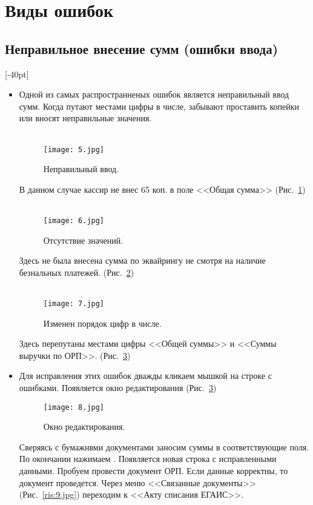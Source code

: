 \section{Виды ошибок}
\subsection{Неправильное внесение сумм (ошибки ввода)}
[-40pt]

\begin{itemize}	
	\item Одной из самых распространненых ошибок является неправильный ввод сумм. Когда путают местами цифры в числе, забывают проставить копейки или вносят неправильные значения.
	\\
	\\
	\begin{figure}[H]
		\texttt{[image: 5.jpg]}
		\caption{Неправильный ввод.}
		\label{ris:5.jpg}
	\end{figure}
	В данном случае кассир не внес 65 коп. в поле <<Общая сумма>> (Рис.~\ref{ris:5.jpg})	
	\\
	\\	
	\begin{figure}[H]
		\texttt{[image: 6.jpg]}
		\caption{Отсутствие значений.}
		\label{ris:6.jpg}
	\end{figure}
	Здесь не была внесена сумма по эквайрингу не смотря на наличие безнальных платежей.  (Рис.~\ref{ris:6.jpg})	
	\\
	\\
		\begin{figure}[H]
		\texttt{[image: 7.jpg]}
		\caption{Изменен порядок цифр в числе.}
		\label{ris:7.jpg}
	\end{figure}
	Здесь  перепутаны местами цифры <<Общей суммы>> и <<Суммы выручки по ОРП>>.  (Рис.~\ref{ris:7.jpg})	
	
	\newpage
	\item Для исправления этих ошибок дважды кликаем мышкой на строке с ошибками. Появляется окно редактирования  (Рис.~\ref{ris:7.jpg})	
			\begin{figure}[H]
		\texttt{[image: 8.jpg]}
		\caption{Окно редактирования.}
		\label{ris:8.jpg}
	\end{figure}
	
	Сверяясь с бумажнвми документами заносим суммы в соответствующие поля. По окончании нажимаем .
	Появляется новая строка с исправленными данными. Пробуем провести документ  ОРП. Если данные корректны, то документ проведется.
	Через меню <<Связанные документы>> (Рис.~\ref{ris:9.jpg})  переходим к <<Акту списания ЕГАИС>>.


\end{itemize}

